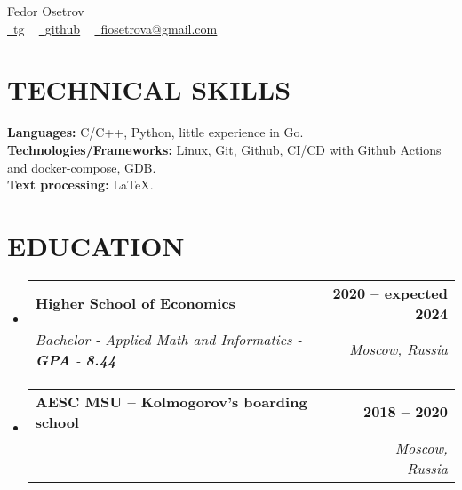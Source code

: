 \documentclass[letterpaper,11pt]{article}
\makeatletter
\newcommand{\resumeSubheading}[4]{
  \vspace{-2pt}\item
    \begin{tabular*}{1.0\textwidth}[t]{l@{\extracolsep{\fill}}r}
      \textbf{\large#1} & \textbf{\small #2} \\
      \textit{\large#3} & \textit{\small #4} \\
      
    \end{tabular*}\vspace{-7pt}
}
\newcommand{\resumeSubHeadingListStart}{\begin{itemize}[leftmargin=0.0in, label={}]}
\newcommand{\resumeSubHeadingListEnd}{\end{itemize}}
\makeatother
\begin{document}


\begin{center}
    {\Huge  Fedor Osetrov} \\ \vspace{10pt}
    \href{https://t.me/fdr400}{\raisebox{-0.2\height}\faTelegram\ \underline{tg}} ~
    \href{https://github.com/fdr896}{\raisebox{-0.2\height}\faGithub\ \underline{github}} ~
    \href{mailto:fiosetrova@gmail.com}{\raisebox{-0.2\height}\faEnvelope\  \underline{fiosetrova@gmail.com}} ~ 
    \vspace{-8pt}
\end{center}

\section{TECHNICAL SKILLS}
 \begin{itemize}[leftmargin=0.15in, label={}]
    \small{\item{
     \textbf{\normalsize{Languages:}}{ \normalsize{C/C++, Python, little experience in Go.}} \\
     \textbf{\normalsize{Technologies/Frameworks:}}{\normalsize{ Linux, Git, Github, CI/CD with Github Actions and docker-compose, GDB.}} \\
     \textbf{\normalsize{Text processing:}}{\normalsize{ LaTeX.}} \\
    }}
 \end{itemize}
 \vspace{-15pt}

\section{EDUCATION}
  \resumeSubHeadingListStart
    \resumeSubheading
      {Higher School of Economics}{2020 -- expected 2024}
      {Bachelor - Applied Math and Informatics - \textbf{GPA} - \textbf{8.44}}{Moscow, Russia}
  \resumeSubHeadingListEnd
  
  \resumeSubHeadingListStart
    \resumeSubheading
      {AESC MSU -- Kolmogorov’s boarding school}{2018 -- 2020}
      {}{Moscow, Russia}
  \resumeSubHeadingListEnd

\end{document}
